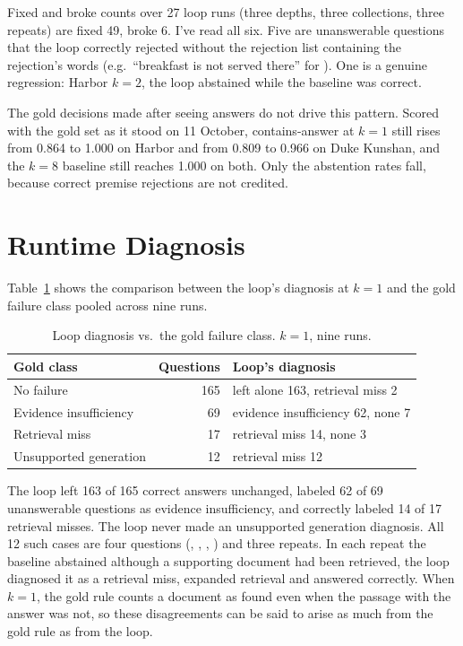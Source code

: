 \documentclass[12pt, a4paper, oneside]{report}
\newcommand{\code}[1]{\texttt{\detokenize{#1}}}
\begin{document}
Fixed and broke counts over 27 loop runs (three depths, three collections,
three repeats) are fixed 49, broke 6. I've read all six. Five are
unanswerable questions that the loop correctly rejected without the
rejection list containing the rejection's words (e.g.\ ``breakfast is not
served there'' for \code{dku-032}). One is a genuine regression: Harbor
\code{seed-007} $k=2$, the loop abstained while the baseline was correct.

The gold decisions made after seeing answers do not drive this pattern.
Scored with the gold set as it stood on 11 October, contains-answer at
$k=1$ still rises from 0.864 to 1.000 on Harbor and from 0.809 to 0.966 on
Duke Kunshan, and the $k=8$ baseline still reaches 1.000 on both. Only the
abstention rates fall, because correct premise rejections are not credited.

\section{Runtime Diagnosis}

Table~\ref{tbl:diagnosis} shows the comparison between the loop's diagnosis
at $k=1$ and the gold failure class pooled across nine runs.

\begin{table}[htbp]
\centering
\footnotesize
\begin{tabular}{@{}lrl@{}}
\toprule
Gold class & Questions & Loop's diagnosis \\
\midrule
No failure & 165 & left alone 163, retrieval miss 2 \\
Evidence insufficiency & 69 & evidence insufficiency 62, none 7 \\
Retrieval miss & 17 & retrieval miss 14, none 3 \\
Unsupported generation & 12 & retrieval miss 12 \\
\bottomrule
\end{tabular}
\caption{Loop diagnosis vs.\ the gold failure class. $k=1$, nine runs.}
\label{tbl:diagnosis}
\end{table}

The loop left 163 of 165 correct answers unchanged, labeled 62 of 69
unanswerable questions as evidence insufficiency, and correctly labeled 14
of 17 retrieval misses. The loop never made an unsupported generation
diagnosis. All 12 such cases are four questions (\code{dku-012},
\code{dku-013}, \code{gold-015}, \code{gold-024}) and three repeats. In each
repeat the baseline abstained although a supporting document had been
retrieved, the loop diagnosed it as a retrieval miss, expanded retrieval and
answered correctly. When $k=1$, the gold rule counts a document as found even
when the passage with the answer was not, so these disagreements can be said to
arise as much from the gold rule as from the loop.
\end{document}
